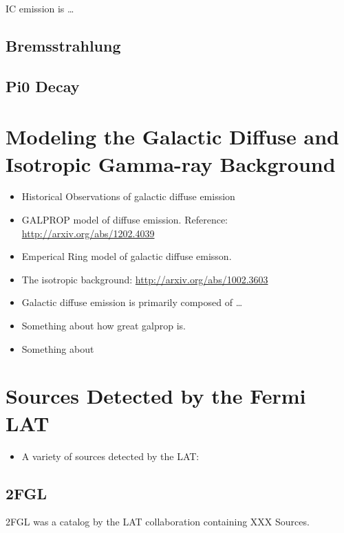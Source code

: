 \ac{IC} emission is \ldots

\subsection{Bremsstrahlung}

\subsection{Pi0 Decay}

\section{Modeling the Galactic Diffuse and Isotropic Gamma-ray Background}

\begin{itemize}
  \item Historical Observations of galactic diffuse emission
  \item GALPROP model of diffuse emission.
  Reference: \url{http://arxiv.org/abs/1202.4039}
  \item Emperical Ring model of galactic diffuse emisson.
  \item The isotropic background: \url{http://arxiv.org/abs/1002.3603}
\end{itemize}

\begin{itemize}
  \item Galactic diffuse emission is primarily composed of \ldots
  \item Something about how great galprop is.
  \item Something about
\end{itemize}

\section{Sources Detected by the Fermi \acs{LAT}}

\begin{itemize}
  \item A variety of sources detected by the \acs{LAT}:
\end{itemize}

\subsection{\acf{2FGL}}

\ac{2FGL} was a catalog by the LAT collaboration containing XXX Sources.

